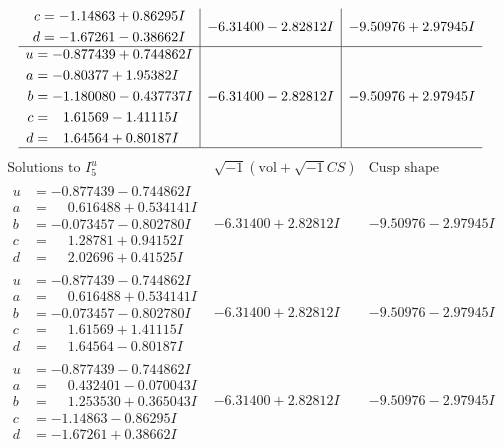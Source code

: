 \documentclass[1p]{elsarticle_modified}
\theoremstyle{definition}
\newcommand{\I}{\sqrt{-1}}
\begin{document}
$$\begin{array}{c|c|c}
\begin{aligned}
c &= -1.14863 + 0.86295 I \\
d &= -1.67261 - 0.38662 I\end{aligned}
 & -6.31400 - 2.82812 I & -9.50976 + 2.97945 I \\ \hline\begin{aligned}
u &= -0.877439 + 0.744862 I \\
a &= -0.80377 + 1.95382 I \\
b &= -1.180080 - 0.437737 I \\
c &= \phantom{-}1.61569 - 1.41115 I \\
d &= \phantom{-}1.64564 + 0.80187 I\end{aligned}
 & -6.31400 - 2.82812 I & -9.50976 + 2.97945 I\\
 \hline 
 \end{array}$$\newpage$$\begin{array}{c|c|c}  
\text{Solutions to }I^u_{5}& \I (\text{vol} + \sqrt{-1}CS) & \text{Cusp shape}\\
 \hline 
\begin{aligned}
u &= -0.877439 - 0.744862 I \\
a &= \phantom{-}0.616488 + 0.534141 I \\
b &= -0.073457 - 0.802780 I \\
c &= \phantom{-}1.28781 + 0.94152 I \\
d &= \phantom{-}2.02696 + 0.41525 I\end{aligned}
 & -6.31400 + 2.82812 I & -9.50976 - 2.97945 I \\ \hline\begin{aligned}
u &= -0.877439 - 0.744862 I \\
a &= \phantom{-}0.616488 + 0.534141 I \\
b &= -0.073457 - 0.802780 I \\
c &= \phantom{-}1.61569 + 1.41115 I \\
d &= \phantom{-}1.64564 - 0.80187 I\end{aligned}
 & -6.31400 + 2.82812 I & -9.50976 - 2.97945 I \\ \hline\begin{aligned}
u &= -0.877439 - 0.744862 I \\
a &= \phantom{-}0.432401 - 0.070043 I \\
b &= \phantom{-}1.253530 + 0.365043 I \\
c &= -1.14863 - 0.86295 I \\
d &= -1.67261 + 0.38662 I\end{aligned}
 & -6.31400 + 2.82812 I & -9.50976 - 2.97945 I \\ \hline\begin{aligned}

\end{aligned}
\end{array}$$
\end{document}
